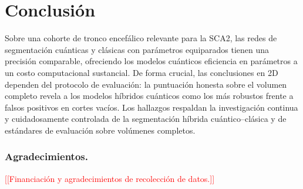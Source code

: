 \documentclass[runningheads]{llncs}
\newcommand{\todo}[1]{\textcolor{red}{[[#1]]}}
\begin{document}
\section{Conclusión}
Sobre una cohorte de tronco encefálico relevante para la SCA2, las redes de
segmentación cuánticas y clásicas con parámetros equiparados tienen una
precisión comparable, ofreciendo los modelos cuánticos eficiencia en parámetros
a un costo computacional sustancial. De forma crucial, las conclusiones en 2D
dependen del protocolo de evaluación: la puntuación honesta sobre el volumen
completo revela a los modelos híbridos cuánticos como los más robustos frente a
falsos positivos en cortes vacíos. Los hallazgos respaldan la investigación
continua y cuidadosamente controlada de la segmentación híbrida
cuántico--clásica y de estándares de evaluación sobre volúmenes completos.

\subsubsection*{Agradecimientos.} \todo{Financiación y agradecimientos de
recolección de datos.}
\end{document}
